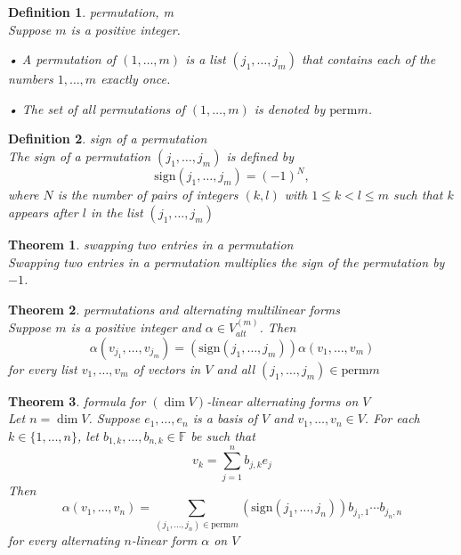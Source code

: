 \documentclass{article}
\newtheorem{theorem}{Theorem}[subsection]
\newtheorem{definition}{Definition}[subsection]
\newcommand{\FF}{\mathbb{F}}
\newcommand{\sign}{\text{sign}}
\newcommand{\perm}{\text{perm}}
\begin{document}
\begin{CJK}{UTF8}{gkai}
\begin{definition}
    permutation, \perm m\\

    Suppose $m$ is a positive integer.

    • A permutation of $(1,\ldots,m)$ is a list $(j_1,\ldots,j_m)$ that contains each of the numbers $1,\ldots,m$ exactly once.

    • The set of all permutations of $(1,\ldots,m)$ is denoted by $\perm m$.
\end{definition}

\begin{definition}
    sign of a permutation\\
    
    The sign of a permutation $(j_1,\ldots,j_m)$ is defined by
    \[\sign(j_1, \ldots,j_m) = (-1)^N,\]
    where $N$ is the number of pairs of integers $(k,l)$ with $1 \leq k < l \leq m$ such that $k$ appears after $l$ in the list $(j_1,\ldots,j_m)$
\end{definition}

\begin{theorem}
    swapping two entries in a permutation\\

    Swapping two entries in a permutation multiplies the sign of the permutation by $-1$.
\end{theorem}

\begin{theorem}
    permutations and alternating multilinear forms\\

    Suppose $m$ is a positive integer and $\alpha \in V^{(m)}_{alt}$. Then
    \[\alpha(v_{j_1}, \ldots,v_{j_m} ) = (\sign(j_1,\ldots,j_m))\alpha(v_1,\ldots,v_m)\]
    for every list $v_1,\ldots,v_m$ of vectors in $V$ and all $(j_1,\ldots,j_m) \in \perm m$
\end{theorem}

\begin{theorem}
    formula for $(\dim V)$-linear alternating forms on $V$\\

    Let $n = \dim V$. Suppose $e_1,\ldots,e_n$ is a basis of $V$ and $v_1,\ldots,v_n \in V$. For each $k \in \{1,\ldots,n\}$, let $b_{1,k},\ldots,b_{n,k} \in \FF$ be such that
    \[v_k = \sum_{j = 1}^n b_{j,k}e_j\]
    Then
    \[\alpha(v_1,\ldots,v_n) = \sum_{(j_1,\ldots,j_n)\in \perm m} (\sign(j_1,\ldots,j_n)) b_{j_1,1} \cdots b_{j_n,n}\]
    for every alternating $n$-linear form $\alpha$ on $V$
\end{theorem}


\end{CJK}
\end{document}
